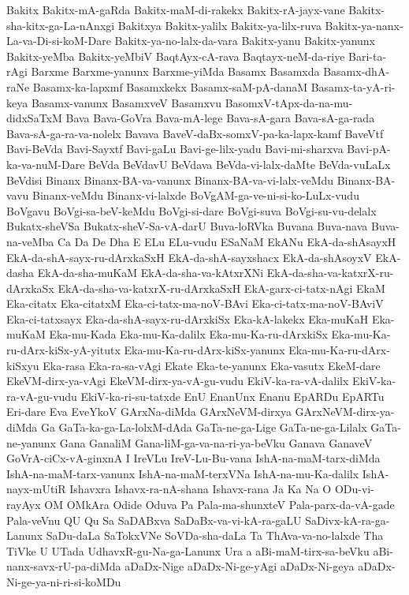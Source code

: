 {Bakitx
Bakitx-mA-gaRda
Bakitx-maM-di-rakekx
Bakitx-rA-jayx-vane
Bakitx-sha-kitx-ga-La-nAnxgi
Bakitxya
Bakitx-yalilx
Bakitx-ya-lilx-ruva
Bakitx-ya-nanx-La-va-Di-si-koM-Dare
Bakitx-ya-no-lalx-da-vara
Bakitx-yanu
Bakitx-yanunx
Bakitx-yeMba
Bakitx-yeMbiV
BaqtAyx-cA-rava
Baqtayx-neM-da-riye
Bari-ta-rAgi
Barxme
Barxme-yanunx
Barxme-yiMda
Basamx
Basamxda
Basamx-dhA-raNe
Basamx-ka-lapxmf
Basamxkekx
Basamx-saM-pA-danaM
Basamx-ta-yA-ri-keya
Basamx-vanunx
BasamxveV
Basamxvu
BasomxV-tApx-da-na-mu-didxSaTxM
Bava
Bava-GoVra
Bava-mA-lege
Bava-sA-gara
Bava-sA-ga-rada
Bava-sA-ga-ra-va-nolelx
Bavava
BaveV-daBx-somxV-pa-ka-lapx-kamf
BaveVtf
Bavi-BeVda
Bavi-Sayxtf
Bavi-gaLu
Bavi-ge-lilx-yadu
Bavi-mi-sharxva
Bavi-pA-ka-va-nuM-Dare
BeVda
BeVdavU
BeVdava
BeVda-vi-lalx-daMte
BeVda-vuLaLx
BeVdisi
Binanx
Binanx-BA-va-vanunx
Binanx-BA-va-vi-lalx-veMdu
Binanx-BA-vavu
Binanx-veMdu
Binanx-vi-lalxde
BoVgAM-ga-ve-ni-si-ko-LuLx-vudu
BoVgavu
BoVgi-sa-beV-keMdu
BoVgi-si-dare
BoVgi-suva
BoVgi-su-vu-delalx
Bukatx-sheVSa
Bukatx-sheV-Sa-vA-darU
Buva-loRVka
Buvana
Buva-nava
Buva-na-veMba
Ca
Da
De
Dha
E
ELu
ELu-vudu
ESaNaM
EkANu
EkA-da-shAsayxH
EkA-da-shA-sayx-ru-dArxkaSxH
EkA-da-shA-sayxshacx
EkA-da-shAsoyxV
EkA-dasha
EkA-da-sha-muKaM
EkA-da-sha-va-kAtxrXNi
EkA-da-sha-va-katxrX-ru-dArxkaSx
EkA-da-sha-va-katxrX-ru-dArxkaSxH
EkA-garx-ci-tatx-nAgi
EkaM
Eka-citatx
Eka-citatxM
Eka-ci-tatx-ma-noV-BAvi
Eka-ci-tatx-ma-noV-BAviV
Eka-ci-tatxsayx
Eka-da-shA-sayx-ru-dArxkiSx
Eka-kA-lakekx
Eka-muKaH
Eka-muKaM
Eka-mu-Kada
Eka-mu-Ka-dalilx
Eka-mu-Ka-ru-dArxkiSx
Eka-mu-Ka-ru-dArx-kiSx-yA-yitutx
Eka-mu-Ka-ru-dArx-kiSx-yanunx
Eka-mu-Ka-ru-dArx-kiSxyu
Eka-rasa
Eka-ra-sa-vAgi
Ekate
Eka-te-yanunx
Eka-vasutx
EkeM-dare
EkeVM-dirx-ya-vAgi
EkeVM-dirx-ya-vA-gu-vudu
EkiV-ka-ra-vA-dalilx
EkiV-ka-ra-vA-gu-vudu
EkiV-ka-ri-su-tatxde
EnU
EnanUnx
Enanu
EpARDu
EpARTu
Eri-dare
Eva
EveYkoV
GArxNa-diMda
GArxNeVM-dirxya
GArxNeVM-dirx-ya-diMda
Ga
GaTa-ka-ga-La-lolxM-dAda
GaTa-ne-ga-Lige
GaTa-ne-ga-Lilalx
GaTa-ne-yanunx
Gana
GanaliM
Gana-liM-ga-va-na-ri-ya-beVku
Ganava
GanaveV
GoVrA-ciCx-vA-ginxnA
I
IreVLu
IreV-Lu-Bu-vana
IshA-na-maM-tarx-diMda
IshA-na-maM-tarx-vanunx
IshA-na-maM-terxVNa
IshA-na-mu-Ka-dalilx
IshA-nayx-mUtiR
Ishavxra
Ishavx-ra-nA-shana
Ishavx-rana
Ja
Ka
Na
O
ODu-vi-rayAyx
OM
OMkAra
Odide
Oduva
Pa
Pala-ma-shunxteV
Pala-parx-da-vA-gade
Pala-veVnu
QU
Qu
Sa
SaDABxva
SaDaBx-va-vi-kA-ra-gaLU
SaDivx-kA-ra-ga-Lanunx
SaDu-daLa
SaTokxVNe
SoVDa-sha-daLa
Ta
ThAva-va-no-lalxde
Tha
TiVke
U
UTada
UdhavxR-gu-Na-ga-Lanunx
Ura
a
aBi-maM-tirx-sa-beVku
aBi-nanx-savx-rU-pa-diMda
aDaDx-Nige
aDaDx-Ni-ge-yAgi
aDaDx-Ni-geya
aDaDx-Ni-ge-ya-ni-ri-si-koMDu
}
